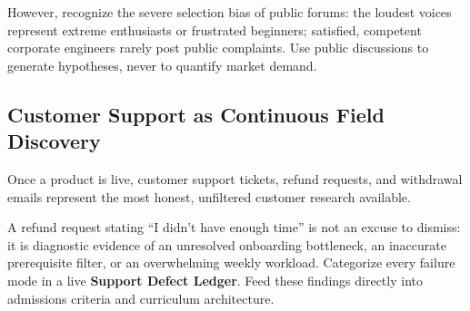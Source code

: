 However, recognize the severe selection bias of public forums: the loudest voices represent extreme enthusiasts or frustrated beginners; satisfied, competent corporate engineers rarely post public complaints. Use public discussions to generate hypotheses, never to quantify market demand.

\subsection{Customer Support as Continuous Field Discovery}

Once a product is live, customer support tickets, refund requests, and withdrawal emails represent the most honest, unfiltered customer research available.

A refund request stating ``I didn't have enough time'' is not an excuse to dismiss: it is diagnostic evidence of an unresolved onboarding bottleneck, an inaccurate prerequisite filter, or an overwhelming weekly workload. Categorize every failure mode in a live \textbf{Support Defect Ledger}. Feed these findings directly into admissions criteria and curriculum architecture.
